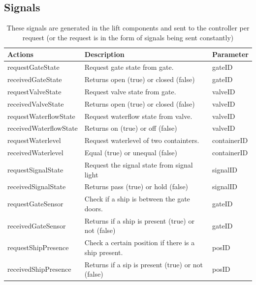 		\subsection{Signals}
		\begin{table}[htbp]
			\centering
			\caption{These signals are generated in the lift components and sent to the controller per request (or the request is in the form of signals being sent constantly)}
			\begin{tabular}{lll}
				\toprule
				Actions & \textbf{Description} & \textbf{Parameter} \\
				\midrule
				requestGateState & Request gate state from gate.  & gateID \\
				receivedGateState & Returns open (true) or closed (false) & gateID \\
				\midrule
				requestValveState & Request valve state from gate. & valveID \\
				receivedValveState & Returns open (true) or closed (false) & valveID \\
				\midrule
				requestWaterflowState & Request waterflow state from valve. & valveID \\
				receivedWaterflowState & Returns on (true) or off (false) & valveID \\
				\midrule
				requestWaterlevel & Request waterlevel of two containters. & containerID \\
				receivedWaterlevel & Equal (true) or unequal (false) & containerID \\
				\midrule
				requestSignalState & Request the signal state from signal light & signalID \\
				receivedSignalState & Returns pass (true) or hold (false) & signalID \\
				\midrule
				requestGateSensor & Check if a ship is between the gate doors. & gateID \\
				receivedGateSensor & Returns if a ship is present (true) or not (false) & gateID \\
				\midrule
				requestShipPresence & Check a certain position if there is a ship present. & posID \\
				receivedShipPresence  & Returns if a sip is present (true) or not (false) & posID \\
				\bottomrule
				\end{tabular}%
				\label{tab:addlabel}%
				\end{table}%
				
				
